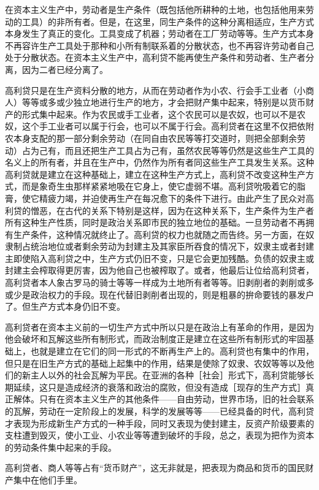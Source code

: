 在资本主义生产中，劳动者是生产条件（既包括他所耕种的土地，也包括他用来劳动的工具）的非所有者。但是，在这里，同生产条件的这种分离相适应，生产方式本身发生了真正的变化。工具变成了机器；劳动者在工厂劳动等等。生产方式本身不再容许生产工具处于那种和小所有制联系着的分散状态，也不再容许劳动者自己处于分散状态。在资本主义生产中，高利贷不能再使生产条件和劳动者、生产者分离，因为二者已经分离了。

高利贷只是在生产资料分散的地方，从而在劳动者作为小农、行会手工业者（小商人）等等或多或少独立地进行生产的地方，才会把财产集中起来，特别是以货币财产的形式集中起来。作为农民或手工业者，这个农民可以是农奴，也可以不是农奴，这个手工业者可以属于行会，也可以不属于行会。高利贷者在这里不仅把依附农本身支配的那一部分剩余劳动（在同自由农民等等打交道时，则把全部剩余劳动）占为己有，而且还把生产工具占为己有，虽然农民等等仍然是这些生产工具的名义上的所有者，并且在生产中，仍然作为所有者同这些生产工具发生关系。这种高利贷就是建立在这种基础上，建立在这种生产方式上，高利贷不改变这种生产方式，而是象奇生虫那样紧紧地吸在它身上，使它虚弱不堪。高利贷吮吸着它的脂膏，使它精疲力竭，并迫使再生产在每况愈下的条件下进行。由此产生了民众对高利贷的憎恶，在古代的关系下特别是这样，因为在这种关系下，生产条件为生产者所有这种生产性质，同时是政治关系即市民的独立地位的基础。一旦劳动者不再拥有生产条件，这种情况就终止了。高利贷的权力也就随之而告终。另一方面，在奴隶制占统治地位或者剩余劳动为封建主及其家臣所吞食的情况下，奴隶主或者封建主即使陷入高利贷之中，生产方式仍旧不变，只是它会更加残酷。负债的奴隶主或封建主会榨取得更厉害，因为他自己也被榨取了。或者，他最后让位给高利贷者，高利贷者本人象古罗马的骑士等等一样成为土地所有者等等。旧剥削者的剥削或多或少是政治权力的手段。现在代替旧剥削者出现的，则是粗暴的拚命要钱的暴发户了。但生产方式本身仍旧不变。

高利贷者在资本主义前的一切生产方式中所以只是在政治上有革命的作用，是因为他会破坏和瓦解这些所有制形式，而政治制度正是建立在这些所有制形式的牢固基础上，也就是建立在它们的同一形式的不断再生产上的。高利贷也有集中的作用，但只是在旧生产方式的基础上起集中的作用，结果是使除了奴隶、农奴等等以及他们的新主人以外的社会瓦解为平民。在亚洲的各种［社会］形式下，高利贷能够长期延续，这只是造成经济的衰落和政治的腐败，但没有造成［现存的生产方式］真正解体。只有在资本主义生产的其他条件——自由劳动，世界市场，旧的社会联系的瓦解，劳动在一定阶段上的发展，科学的发展等等——已经具备的时代，高利贷才表现为形成新生产方式的一种手段，同时又表现为使封建主，反资产阶级要素的支柱遭到毁灭，使小工业、小农业等等遭到破坏的手段，总之，表现为把作为资本的劳动条件集中起来的手段。

高利贷者、商人等等占有“货币财产”，这无非就是，把表现为商品和货币的国民财产集中在他们手里。

